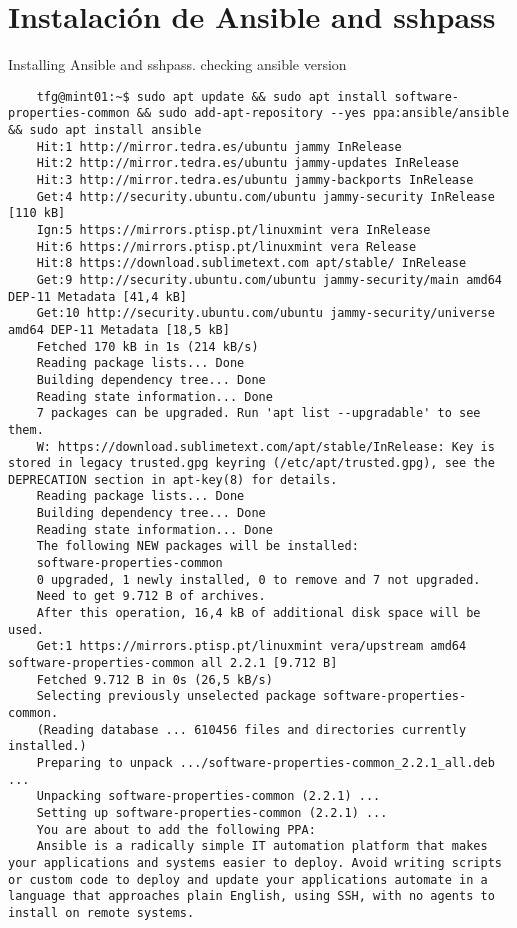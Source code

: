 \documentclass[../main.tex]{subfiles}
\begin{document}
\section{Instalación de Ansible and sshpass}
Installing Ansible and sshpass. checking ansible version
\lstconsolestyle
\begin{lstlisting}
	tfg@mint01:~$ sudo apt update && sudo apt install software-properties-common && sudo add-apt-repository --yes ppa:ansible/ansible && sudo apt install ansible
	Hit:1 http://mirror.tedra.es/ubuntu jammy InRelease
	Hit:2 http://mirror.tedra.es/ubuntu jammy-updates InRelease                    
	Hit:3 http://mirror.tedra.es/ubuntu jammy-backports InRelease                  
	Get:4 http://security.ubuntu.com/ubuntu jammy-security InRelease [110 kB]      
	Ign:5 https://mirrors.ptisp.pt/linuxmint vera InRelease                        
	Hit:6 https://mirrors.ptisp.pt/linuxmint vera Release                          
	Hit:8 https://download.sublimetext.com apt/stable/ InRelease                   
	Get:9 http://security.ubuntu.com/ubuntu jammy-security/main amd64 DEP-11 Metadata [41,4 kB]
	Get:10 http://security.ubuntu.com/ubuntu jammy-security/universe amd64 DEP-11 Metadata [18,5 kB]
	Fetched 170 kB in 1s (214 kB/s)              
	Reading package lists... Done
	Building dependency tree... Done
	Reading state information... Done
	7 packages can be upgraded. Run 'apt list --upgradable' to see them.
	W: https://download.sublimetext.com/apt/stable/InRelease: Key is stored in legacy trusted.gpg keyring (/etc/apt/trusted.gpg), see the DEPRECATION section in apt-key(8) for details.
	Reading package lists... Done
	Building dependency tree... Done
	Reading state information... Done
	The following NEW packages will be installed:
	software-properties-common
	0 upgraded, 1 newly installed, 0 to remove and 7 not upgraded.
	Need to get 9.712 B of archives.
	After this operation, 16,4 kB of additional disk space will be used.
	Get:1 https://mirrors.ptisp.pt/linuxmint vera/upstream amd64 software-properties-common all 2.2.1 [9.712 B]
	Fetched 9.712 B in 0s (26,5 kB/s)                      
	Selecting previously unselected package software-properties-common.
	(Reading database ... 610456 files and directories currently installed.)
	Preparing to unpack .../software-properties-common_2.2.1_all.deb ...
	Unpacking software-properties-common (2.2.1) ...
	Setting up software-properties-common (2.2.1) ...
	You are about to add the following PPA:
	Ansible is a radically simple IT automation platform that makes your applications and systems easier to deploy. Avoid writing scripts or custom code to deploy and update your applications automate in a language that approaches plain English, using SSH, with no agents to install on remote systems.
	

\end{lstlisting}
\end{document}
